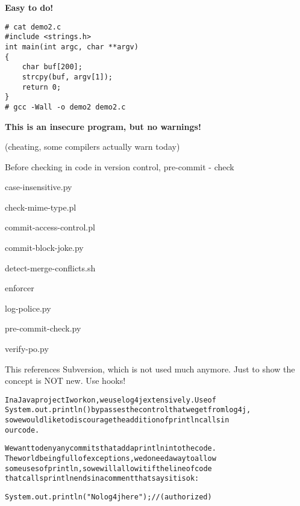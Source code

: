 \documentclass[Screen16to9,17pt]{foils}
\begin{document}
\vskip 15mm
\centerline{\bf\LARGE\color{security6blue}Easy to do!}


\begin{verbatim}
# cat demo2.c
#include <strings.h>
int main(int argc, char **argv)
{
    char buf[200];
    strcpy(buf, argv[1]);
    return 0;
}
# gcc -Wall -o demo2 demo2.c
\end{verbatim}

\vskip 1cm
\centerline{\bf\large\color{security6blue}This is an insecure program, but no warnings!}

(cheating, some compilers actually warn today)


\begin{list1}
\item Before checking in code in version control,  pre-commit - check
\begin{list2}
\item case-insensitive.py
\item check-mime-type.pl
\item commit-access-control.pl
\item commit-block-joke.py
\item detect-merge-conflicts.sh
\item enforcer
\item log-police.py
\item pre-commit-check.py
\item verify-po.py
\end{list2}
\item {}
\item {}
\end{list1}

This references Subversion, which is not used much anymore. Just to show the concept is NOT new. Use hooks!


\begin{alltt}
In a Java project I work on, we use log4j extensively.  Use of
System.out.println() bypasses the control that we get from log4j,
so we would like to discourage the addition of println calls in
our code.

We want to deny any commits that add a println into the code.
The world being full of exceptions, we do need a way to allow
some uses of println, so we will allow it if the line of code
that calls println ends in a comment that says it is ok:

   System.out.println("No log4j here"); // (authorized)
\end{alltt}
\end{document}
